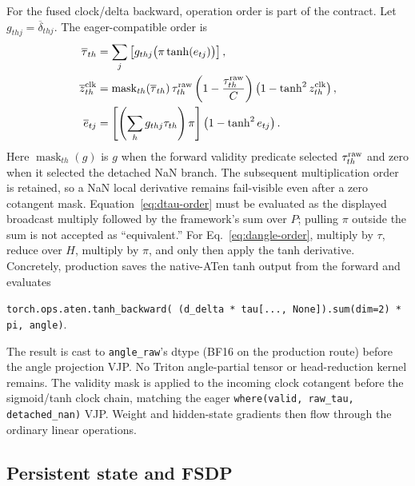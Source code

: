 \documentclass[11pt]{article}
\begin{document}
For the fused clock/delta backward, operation order is part of the contract.  Let
$g_{thj}=\overline\delta_{thj}$.  The eager-compatible order is
\begin{align}
  \overline\tau_{th}
    &=\sum_j\left[g_{thj}\bigl(\pi\tanh(e_{tj})\bigr)\right],
    \label{eq:dtau-order}\\
  \overline z^{\rm clk}_{th}
    &=\operatorname{mask}_{th}(\overline\tau_{th})
      \,\tau^{\rm raw}_{th}\left(1-\frac{\tau^{\rm raw}_{th}}{C}\right)
      \left(1-\tanh^2 z^{\rm clk}_{th}\right),\\
  \overline e_{tj}
    &=\left[\left(\sum_h g_{thj}\tau_{th}\right)\pi\right]
      \left(1-\tanh^2 e_{tj}\right).
  \label{eq:dangle-order}
\end{align}
Here $\operatorname{mask}_{th}(g)$ is $g$ when the forward validity predicate selected
$\tau^{\rm raw}_{th}$ and zero when it selected the detached NaN branch.  The subsequent
multiplication order is retained, so a NaN local derivative remains fail-visible even after a zero
cotangent mask.
Equation~\eqref{eq:dtau-order} must be evaluated as the displayed broadcast multiply followed by
the framework's sum over $P$; pulling $\pi$ outside the sum is not accepted as ``equivalent.''
For Eq.~\eqref{eq:dangle-order}, multiply by $\tau$, reduce over $H$, multiply by $\pi$, and only
then apply the tanh derivative.  Concretely, production saves the native-ATen tanh output from the
forward and evaluates
\begin{center}
\texttt{torch.ops.aten.tanh\_backward(}\linebreak[0]
\texttt{  (d\_delta * tau[..., None]).sum(dim=2) * pi, angle)}.
\end{center}
The result is cast to \texttt{angle\_raw}'s dtype (BF16 on the production route) before the angle
projection VJP.  No Triton angle-partial tensor or head-reduction kernel remains.  The validity
mask is applied to the incoming clock cotangent before the sigmoid/tanh clock chain, matching the
eager \texttt{where(valid, raw\_tau, detached\_nan)} VJP.  Weight and hidden-state gradients then
flow through the ordinary linear operations.

\subsection{Persistent state and FSDP}
\end{document}
